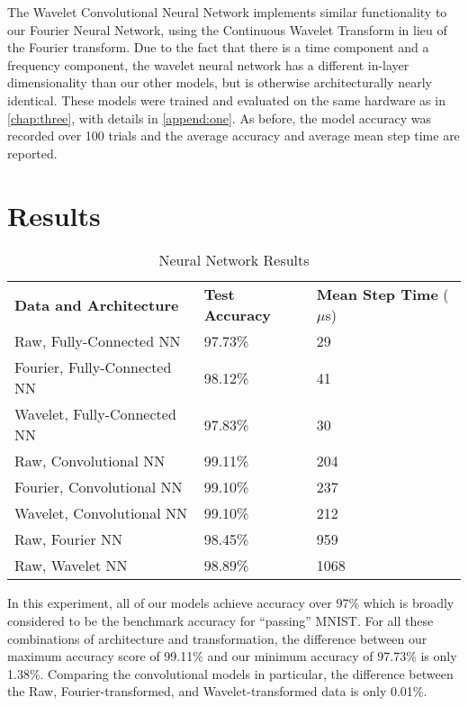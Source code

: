 The Wavelet Convolutional Neural Network implements similar functionality to our Fourier Neural Network, using the Continuous Wavelet Transform in lieu of the Fourier transform.
Due to the fact that there is a time component and a frequency component, the wavelet neural network has a different in-layer dimensionality than our other models, but is otherwise architecturally nearly identical.
These models were trained and evaluated on the same hardware as in \ref{chap:three}, with details in \ref{append:one}.
As before, the model accuracy was recorded over 100 trials and the average accuracy and average mean step time are reported.

\section{Results}
\begin{table}[h]
\centering	
\begin{tabular}{l|ll}
\textbf{Data and Architecture}  & \textbf{Test Accuracy} & \textbf{Mean Step Time} ($\mu$s) \\\cline{1-3}
Raw, Fully-Connected NN            & 97.73\%         & 29\\
Fourier, Fully-Connected NN        & 98.12\%         & 41\\
Wavelet, Fully-Connected NN        & 97.83\%         & 30\\
\hline
Raw, Convolutional NN              & 99.11\%         & 204\\ 
Fourier, Convolutional NN          & 99.10\%         & 237\\
Wavelet, Convolutional NN          & 99.10\%         & 212\\
\hline
Raw, Fourier NN                    & 98.45\%         & 959\\
Raw, Wavelet NN                    & 98.89\%         & 1068\\ 
\end{tabular}
\caption{Neural Network Results}
\label{Tab:test}
\end{table}

In this experiment, all of our models achieve accuracy over 97\% which is broadly considered to be the benchmark accuracy for ``passing'' MNIST. 
For all these combinations of architecture and transformation, the difference between our maximum accuracy score of 99.11\% and our minimum accuracy of 97.73\% is only 1.38\%.
Comparing the convolutional models in particular, the difference between the Raw, Fourier-transformed, and Wavelet-transformed data is only 0.01\%. 

